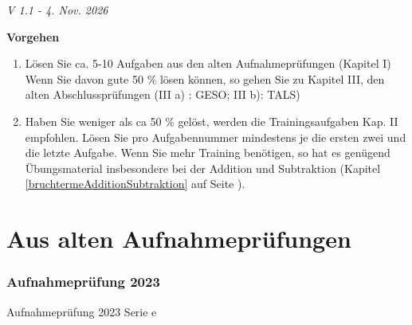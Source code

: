 

\renewcommand{\bbwAufgabenBlockID}{A1Br}

\ifisNURAUFGABEN
\newcommand{\LoesungsBlock}[1]{\TRAINER{Lösung:#1
\vspace{1mm}
\hrule}}%
\else
\newcommand{\LoesungsBlock}[1]{\noTRAINER{\TNTeop{}}\TRAINER{Lösung:#1
\vspace{1mm}
\hrule}}%
\fi

\usepackage{amssymb} %
\renewcommand{\metaHeaderLine}{Arbeitsblatt Bruchrechnen}
\renewcommand{\arbeitsblattTitel}{Zusammenfassung aller Übungen}

\newcommand{\TNTeopS}[1]{\TRAINER{#1}\noTRAINER{\TNTeop{}}}

\arbeitsblattHeader{}

\begin{center}\textit{\tiny{V 1.1 - 4. Nov. 2026}}\end{center}

\tableofcontents{}

\newpage


\textbf{Vorgehen}


\begin{enumerate}
\item 
Lösen Sie ca. 5-10 Aufgaben aus den alten Aufnahmeprüfungen (Kapitel I)
Wenn Sie davon gute 50 \% lösen können, so gehen Sie zu Kapitel III, den
alten Abschlussprüfungen (III a) : GESO; III b): TALS)

\item  Haben Sie weniger als ca 50 \% gelöst, werden die Trainingsaufgaben Kap. II empfohlen.
Lösen Sie pro Aufgabennummer mindestens je die ersten zwei und die letzte Aufgabe.
Wenn Sie mehr Training benötigen, so hat es genügend Übungsmaterial
insbesondere bei der Addition und Subtraktion
(Kapitel \ref{bruchtermeAdditionSubtraktion} auf Seite \pageref{bruchtermeAdditionSubtraktion}).
\end{enumerate}

\newpage

\part{Aus alten Aufnahmeprüfungen}
\section*{Aufnahmeprüfung 2023}
Aufnahmeprüfung 2023 Serie e

